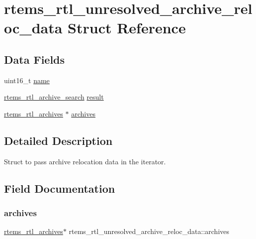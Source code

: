 \hypertarget{structrtems__rtl__unresolved__archive__reloc__data}{}\section{rtems\+\_\+rtl\+\_\+unresolved\+\_\+archive\+\_\+reloc\+\_\+data Struct Reference}
\label{structrtems__rtl__unresolved__archive__reloc__data}
\subsection*{Data Fields}
\begin{DoxyCompactItemize}
\item 
uint16\+\_\+t \mbox{\hyperlink{structrtems__rtl__unresolved__archive__reloc__data_a94655fce8a4e891b438782562e122377}{name}}
\item 
\mbox{\hyperlink{rtl-archive_8h_a82930c14e64f3f5853052e84af4a6c2e}{rtems\+\_\+rtl\+\_\+archive\+\_\+search}} \mbox{\hyperlink{structrtems__rtl__unresolved__archive__reloc__data_a38c4f3523e8a4e33c215497f8f5420ed}{result}}
\item 
\mbox{\hyperlink{structrtems__rtl__archives}{rtems\+\_\+rtl\+\_\+archives}} $\ast$ \mbox{\hyperlink{structrtems__rtl__unresolved__archive__reloc__data_a26d75097c8284935a4dda80d843570ce}{archives}}
\end{DoxyCompactItemize}


\subsection{Detailed Description}
Struct to pass archive relocation data in the iterator. 

\subsection{Field Documentation}
\mbox{\label{structrtems__rtl__unresolved__archive__reloc__data_a26d75097c8284935a4dda80d843570ce}} 
\subsubsection{\texorpdfstring{archives}{archives}}
{\footnotesize\ttfamily \mbox{\hyperlink{structrtems__rtl__archives}{rtems\+\_\+rtl\+\_\+archives}}$\ast$ rtems\+\_\+rtl\+\_\+unresolved\+\_\+archive\+\_\+reloc\+\_\+data\+::archives}

